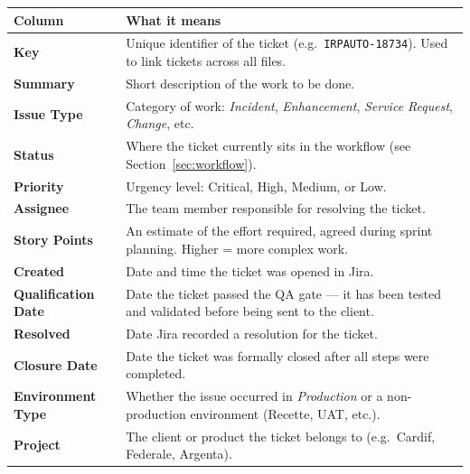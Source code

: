 \documentclass[12pt, a4paper]{article}
\begin{document}
\medskip
\begin{center}
\begin{tabular}{p{4.5cm} p{9cm}}
\toprule
\textbf{Column} & \textbf{What it means} \\
\midrule
\textbf{Key} &
  Unique identifier of the ticket (e.g.\ \texttt{IRPAUTO-18734}).
  Used to link tickets across all files. \\[6pt]

\textbf{Summary} &
  Short description of the work to be done. \\[6pt]

\textbf{Issue Type} &
  Category of work: \emph{Incident}, \emph{Enhancement},
  \emph{Service Request}, \emph{Change}, etc. \\[6pt]

\textbf{Status} &
  Where the ticket currently sits in the workflow
  (see Section~\ref{sec:workflow}). \\[6pt]

\textbf{Priority} &
  Urgency level: Critical, High, Medium, or Low. \\[6pt]

\textbf{Assignee} &
  The team member responsible for resolving the ticket. \\[6pt]

\textbf{Story Points} &
  An estimate of the effort required, agreed during sprint planning.
  Higher = more complex work. \\[6pt]

\textbf{Created} &
  Date and time the ticket was opened in Jira. \\[6pt]

\textbf{Qualification Date} &
  Date the ticket passed the QA gate --- it has been tested and
  validated before being sent to the client. \\[6pt]

\textbf{Resolved} &
  Date Jira recorded a resolution for the ticket. \\[6pt]

\textbf{Closure Date} &
  Date the ticket was formally closed after all steps were completed. \\[6pt]

\textbf{Environment Type} &
  Whether the issue occurred in \emph{Production} or a
  non-production environment (Recette, UAT, etc.). \\[6pt]

\textbf{Project} &
  The client or product the ticket belongs to
  (e.g.\ Cardif, Federale, Argenta). \\

\bottomrule
\end{tabular}
\end{center}
\end{document}
